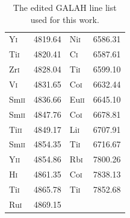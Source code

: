 \begin{table}[]
\begin{tabular}{|l|c||l|c|}
Y\textsc{i} & 4819.64 &  Ni\textsc{i} & 6586.31 \\
Ti\textsc{i} & 4820.41 & C\textsc{i} & 6587.61 \\   
Zr\textsc{i} & 4828.04 &   Ti\textsc{i} & 6599.10 \\
V\textsc{i} & 4831.65 &  Co\textsc{i} & 6632.44 \\
Sm\textsc{ii} & 4836.66 &   Eu\textsc{ii} & 6645.10 \\
Sm\textsc{ii} & 4847.76 &   Co\textsc{i} & 6678.81 \\
Ti\textsc{ii} & 4849.17 & Li\textsc{i} & 6707.91 \\
Sm\textsc{ii} & 4854.35 & Ti\textsc{i} & 6716.67 \\ 
Y\textsc{ii} & 4854.86 &  Rb\textsc{i} & 7800.26 \\ 
H\textsc{i} & 4861.35 &    Co\textsc{i} & 7838.13 \\
Ti\textsc{i} & 4865.78 & Ti\textsc{i} & 7852.68 \\ 
Ru\textsc{i} & 4869.15 &  & \\
\hline
    \end{tabular}
    \caption{The edited GALAH line list used for this work.}
    \label{tabGALAHlinefinal}
\end{table}

